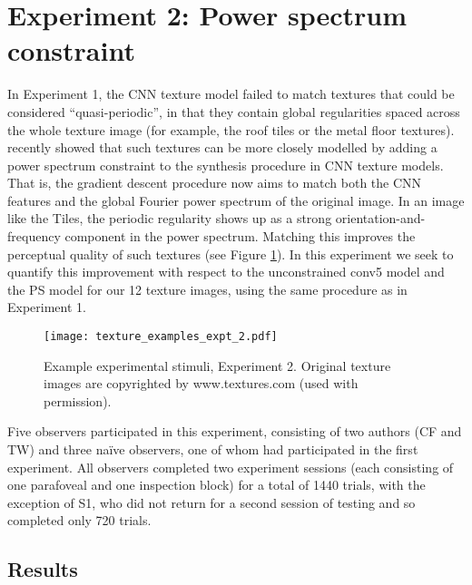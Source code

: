 \documentclass[doc, 11pt,a4paper,natbib]{apa6}\usepackage[]{graphicx}\usepackage[]{color}
\begin{document}
\section{Experiment 2: Power spectrum constraint}
In Experiment 1, the CNN texture model failed to match textures that could be considered ``quasi-periodic'', in that they contain global regularities spaced across the whole texture image (for example, the roof tiles or the metal floor textures).
\citet{liu_texture_2016} recently showed that such textures can be more closely modelled by adding a power spectrum constraint to the synthesis procedure in CNN texture models.
That is, the gradient descent procedure now aims to match both the CNN features and the global Fourier power spectrum of the original image.
In an image like the Tiles, the periodic regularity shows up as a strong orientation-and-frequency component in the power spectrum.
Matching this improves the perceptual quality of such textures (see Figure \ref{fig:expt_2_stimuli}).
In this experiment we seek to quantify this improvement with respect to the unconstrained conv5 model and the PS model for our 12 texture images, using the same procedure as in Experiment 1.

\begin{figure}
\centering
\texttt{[image: texture\_examples\_expt\_2.pdf]}
\caption{
Example experimental stimuli, Experiment 2.
Original texture images are copyrighted by www.textures.com (used with permission).
}
\label{fig:expt_2_stimuli}
\end{figure}



Five observers participated in this experiment, consisting of two authors (CF and TW) and three na\"{i}ve observers, one of whom had participated in the first experiment.
All observers completed two experiment sessions (each consisting of one parafoveal and one inspection block) for a total of 1440 trials,  with the exception of S1, who did not return for a second session of testing and so completed only 720 trials.


\subsection{Results}
\end{document}

